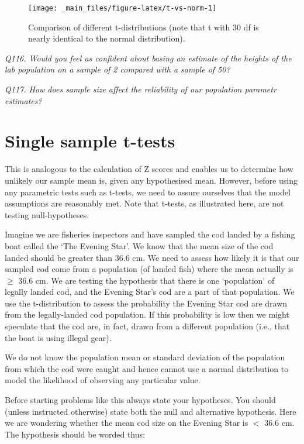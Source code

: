 \documentclass[
  11pt,
  a4paper,
]{book}
\begin{document}
\begin{figure}

{\centering \texttt{[image: \_main\_files/figure-latex/t-vs-norm-1]} 

}

\caption{Comparison of different t-distributions (note that t with 30 df is nearly identical to the normal distribution).}\label{fig:t-vs-norm}
\end{figure}

\emph{Q116. Would you feel as confident about basing an estimate of the heights of the lab population on a sample of 2 compared with a sample of 50?}

\emph{Q117. How does sample size affect the reliability of our population parametr estimates?}

\hypertarget{single-sample-t-tests}{%
\section{Single sample t-tests}\label{single-sample-t-tests}}

This is analogous to the calculation of Z scores and enables us to determine how unlikely our sample mean is, given any hypothesised mean. However, before using any parametric tests such as t-tests, we need to assure ourselves that the model assumptions are reasonably met. Note that t-tests, as illustrated here, are not testing null-hypotheses.

Imagine we are fisheries inspectors and have sampled the cod landed by a fishing boat called the `The Evening Star'. We know that the mean size of the cod landed should be greater than 36.6 cm. We need to assess how likely it is that our sampled cod come from a population (of landed fish) where the mean actually is \(\geq\) 36.6 cm. We are testing the hypothesis that there is one `population' of legally landed cod, and the Evening Star's cod are a part of that population. We use the t-distribution to assess the probability the Evening Star cod are drawn from the legally-landed cod population. If this probability is low then we might speculate that the cod are, in fact, drawn from a different population (i.e., that the boat is using illegal gear).

We do not know the population mean or standard deviation of the population from which the cod were caught and hence cannot use a normal distribution to model the likelihood of observing any particular value.

Before starting problems like this always state your hypotheses. You should (unless instructed otherwise) state both the null and alternative hypothesis. Here we are wondering whether the mean cod size on the Evening Star is \(<\) 36.6 cm. The hypothesis should be worded thus:
\end{document}
